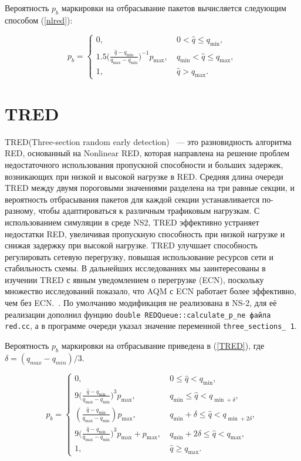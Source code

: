 Вероятность $p_{b}$ маркировки на
отбрасывание пакетов вычисляется следующим способом (\ref{nlred}):

\begin{equation}
\label{nlred}
p_{b} = \begin{cases}
        0, &  \ 0 < \hat{q} \leqslant q_{\min},
        \\
        1.5({\frac{\hat{q} - q_{\min}}{q_{\max} - q_{\min}})^{-1}} {p_{\max}}, & \ q_{\min} < \hat{q} \leqslant q_{\max},
        \\
        1, &  \ \hat{q} > q_{\max}.
\end{cases}
\end{equation}



\section{TRED}

TRED(Three-section random early detection) ~--- это разновидность алгоритма RED, основанный на Nonlinear RED, которая направлена на решение проблем недостаточного использования пропускной способности и больших задержек, возникающих при низкой и высокой нагрузке в RED. 
Средняя длина очереди TRED между двумя пороговыми значениями разделена на три равные секции, и вероятность отбрасывания пакетов для каждой секции устанавливается по-разному, чтобы адаптироваться к различным трафиковым нагрузкам. С использованием симуляции в среде NS2, TRED эффективно устраняет недостатки RED, увеличивая пропускную способность при низкой нагрузке и снижая задержку при высокой нагрузке. TRED улучшает способность регулировать сетевую перегрузку, повышая использование ресурсов сети и стабильность схемы. В дальнейших исследованиях мы заинтересованы в изучении TRED с явным уведомлением о перегрузке (ECN), поскольку множество исследований показало, что AQM с ECN работает более эффективно, чем без ECN.~\citep{TRED}. По умолчанию модификация не реализована в NS-2, для её реализации дополнил фунцию \verb|double REDQueue::calculate_p_ne файла red.cc|, а в программе очереди указал значение переменной \verb|three_sections_ 1|. 

Вероятность $p_{b}$ маркировки на отбрасывание приведена в (\ref{TRED}), где $ \delta = (q_{max} - q_{min})/3 $.

\begin{equation}
\label{TRED}
p_{b} = \begin{cases}
        0, &  \ 0 \leqslant \hat{q} < q_{\min},
        \\
        9({\frac{\hat{q} - q_{\min}}{q_{\max} - q_{\min}})^3} {p_{\max}}, & \ q_{\min} \leqslant  \hat{q} < q_{\min + \delta},
        \\
        (\frac{\hat{q} - q_{\min}}{q_{\max} - q_{\min}}) {p_{\max}}, & \ q_{\min} + \delta \leqslant \hat{q} < q_{\min + 2\delta},
        \\
        9({\frac{\hat{q} - q_{\min}}{q_{\max} - q_{\min}})^3} {p_{\max}} + {p_{\max}}, & \ q_{\min} +2\delta \leqslant  \hat{q} < q_{\max},
        \\
        1, &  \ \hat{q} \geqslant q_{\max}.
\end{cases}
\end{equation} 

